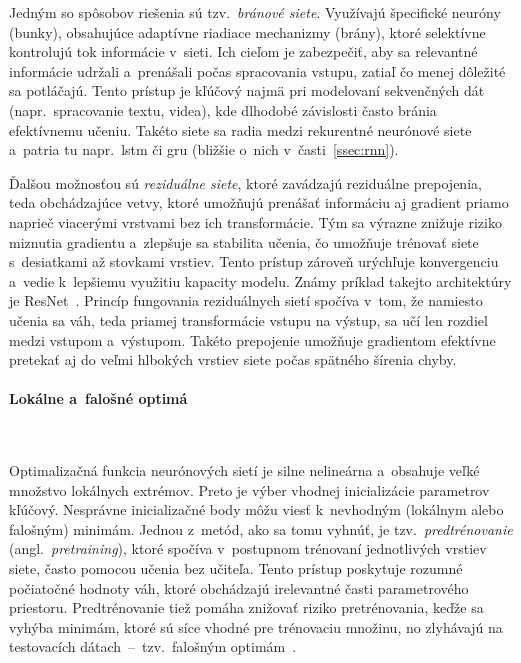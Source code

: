         Jedným so spôsobov riešenia sú tzv.\ \emph{bránové siete}. Využívajú špecifické neuróny (bunky), obsahujúce adaptívne riadiace mechanizmy (brány), ktoré selektívne kontrolujú tok informácie v~sieti. Ich cieľom je zabezpečiť, aby sa relevantné informácie udržali a~prenášali počas spracovania vstupu, zatiaľ čo menej dôležité sa potláčajú. Tento prístup je kľúčový najmä pri modelovaní sekvenčných dát (napr.\ spracovanie textu, videa), kde dlhodobé závislosti často bránia efektívnemu učeniu. Takéto siete sa radia medzi rekurentné neurónové siete a~patria tu napr.\ \acrshort{lstm} či \acrshort{gru} (bližšie o~nich v~časti~\ref{ssec:rnn}).
        
        Ďalšou možnosťou sú \emph{reziduálne siete}, ktoré zavádzajú reziduálne prepojenia, teda obchádzajúce vetvy, ktoré umožňujú prenášať informáciu aj gradient priamo naprieč viacerými vrstvami bez ich transformácie. Tým sa výrazne znižuje riziko miznutia gradientu a~zlepšuje sa stabilita učenia, čo umožňuje trénovať siete s~desiatkami až stovkami vrstiev. Tento prístup zároveň urýchľuje konvergenciu a~vedie k~lepšiemu využitiu kapacity modelu. Známy príklad takejto architektúry je ResNet~\cite{heDeepResidualLearning2016}. Princíp fungovania reziduálnych sietí spočíva v~tom, že namiesto učenia sa váh, teda priamej transformácie vstupu na výstup, sa učí len rozdiel medzi vstupom a~výstupom. Takéto prepojenie umožňuje gradientom efektívne pretekať aj do veľmi hlbokých vrstiev siete počas spätného šírenia chyby.

      \paragraph{Lokálne a~falošné optimá} \
        
      \noindent Optimalizačná funkcia neurónových sietí je silne nelineárna a~obsahuje veľké množstvo lokálnych extrémov. Preto je výber vhodnej inicializácie parametrov kľúčový. Nesprávne inicializačné body môžu viesť k~nevhodným (lokálnym alebo falošným) minimám. Jednou z~metód, ako sa tomu vyhnúť, je tzv.\ \emph{predtrénovanie} (angl.\ \emph{pretraining}), ktoré spočíva v~postupnom trénovaní jednotlivých vrstiev siete, často pomocou učenia bez učiteľa. Tento prístup poskytuje rozumné počiatočné hodnoty váh, ktoré obchádzajú irelevantné časti parametrového priestoru. Predtrénovanie tiež pomáha znižovať riziko pretrénovania, keďže sa vyhýba minimám, ktoré sú síce vhodné pre trénovaciu množinu, no zlyhávajú na testovacích dátach~--~tzv.\ falošným optimám~\cite{aggarwalNeuralNetworksDeep2018}.

